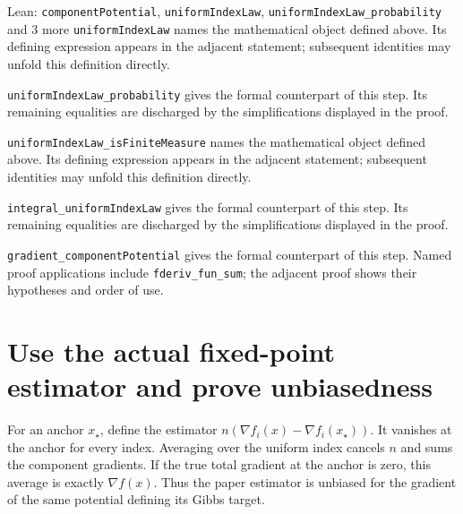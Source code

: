 \documentclass[11pt,a4paper]{article}
\begin{document}
\begin{leanbox}{Lean: \texttt{componentPotential}, \texttt{uniformIndexLaw}, \texttt{uniformIndexLaw\_\allowbreak{}probability} and 3 more}
\texttt{uniform\allowbreak{}Index\allowbreak{}Law} names the mathematical object defined above. Its defining expression appears in the adjacent statement; subsequent identities may unfold this definition directly.




\texttt{uniform\allowbreak{}Index\allowbreak{}Law\_\allowbreak{}probability} gives the formal counterpart of this step. Its remaining equalities are discharged by the simplifications displayed in the proof.




\texttt{uniform\allowbreak{}Index\allowbreak{}Law\_\allowbreak{}is\allowbreak{}Finite\allowbreak{}Measure} names the mathematical object defined above. Its defining expression appears in the adjacent statement; subsequent identities may unfold this definition directly.




\texttt{integral\_\allowbreak{}uniform\allowbreak{}Index\allowbreak{}Law} gives the formal counterpart of this step. Its remaining equalities are discharged by the simplifications displayed in the proof.




\texttt{gradient\_\allowbreak{}component\allowbreak{}Potential} gives the formal counterpart of this step. Named proof applications include \texttt{fderiv\_\allowbreak{}fun\_\allowbreak{}sum}; the adjacent proof shows their hypotheses and order of use.
\end{leanbox}

\section{\texorpdfstring{Use the actual fixed-point estimator and prove unbiasedness}{Use the actual fixed-point estimator and prove unbiasedness}}


For an anchor \(x_\star\), define the estimator \(n(\nabla f_i(x)-\nabla f_i(x_\star))\). It vanishes at the anchor for every index. Averaging over the uniform index cancels \(n\) and sums the component gradients. If the true total gradient at the anchor is zero, this average is exactly \(\nabla f(x)\). Thus the paper estimator is unbiased for the gradient of the same potential defining its Gibbs target.
\end{document}
